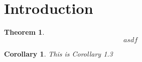 \documentclass[12pt]{amsart}
\numberwithin{equation}{section}
\numberwithin{figure}{section}
\newtheorem{theorem}[equation]{Theorem}
\newtheorem{cor}[equation]{Corollary}
\begin{document}
\section{Introduction}

\begin{theorem}
\begin{equation}
asdf
\end{equation}
\end{theorem}

\begin{cor}
This is Corollary 1.3
\end{cor}
\end{document}
